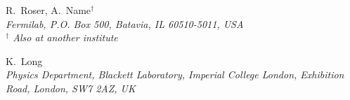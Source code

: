 \clearpage
\thispagestyle{plain}
\setlength\parindent{0em}%
  R.~Roser, A.~Name$^\dagger$
  \\{\it
    Fermilab, P.O. Box 500, Batavia, IL 60510-5011, USA
  }
  \\{\small\it
    $^\dagger$ Also at another institute
  } \\ 
  \par \filbreak
  K.~Long
  \\{\it
    Physics Department, Blackett Laboratory, Imperial College London,
    Exhibition Road, London, SW7 2AZ, UK
  } \\ 
  \par \filbreak
